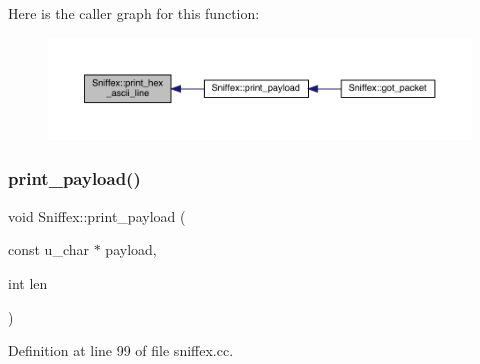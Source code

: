 Here is the caller graph for this function\+:\nopagebreak
\begin{figure}[H]
\begin{center}
\leavevmode
\includegraphics[width=350pt]{class_sniffex_aec1e34cb4b2ff906304f957c205707ea_icgraph}
\end{center}
\end{figure}
\mbox{\label{class_sniffex_a1b24163d441d38f3672800c3de85d149}} 
\subsubsection{\texorpdfstring{print\+\_\+payload()}{print\_payload()}}
{\footnotesize\ttfamily void Sniffex\+::print\+\_\+payload (\begin{DoxyParamCaption}\item[{const u\+\_\+char $\ast$}]{payload,  }\item[{int}]{len }\end{DoxyParamCaption})}



Definition at line 99 of file sniffex.\+cc.

